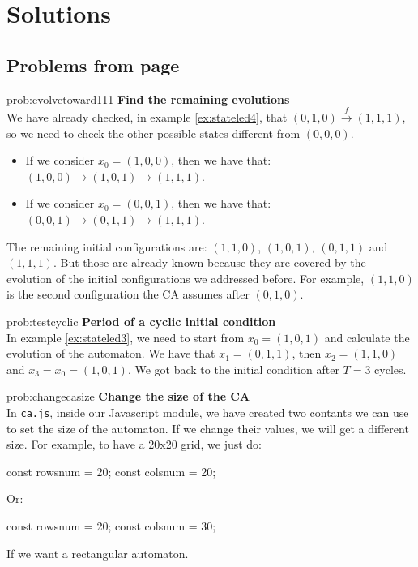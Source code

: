%

\chapter[Solutions]{Solutions}

\section*{Problems from page \pageref{sec:intro}}

\begin{sol}{prob:evolvetoward111}
\textbf{Find the remaining evolutions}\\
We have already checked, in example \ref{ex:stateled4}, that
$(0,1,0) \overset{f}{\rightarrow} (1,1,1)$, so we need to check the other possible
states different from $(0,0,0)$.
\begin{itemize}
\item If we consider $x_0 = (1,0,0)$, then we have that: $(1,0,0) \rightarrow (1,0,1) \rightarrow (1,1,1)$.
\item If we consider $x_0 = (0,0,1)$, then we have that: $(0,0,1) \rightarrow (0,1,1) \rightarrow (1,1,1)$.
\end{itemize}
The remaining initial configurations are: $(1,1,0)$, $(1,0,1)$, $(0,1,1)$ and $(1,1,1)$. But those are already
known because they are covered by the evolution of the initial configurations we addressed before. For example,
$(1,1,0)$ is the second configuration the CA assumes after $(0,1,0)$.
\end{sol}


\begin{sol}{prob:testcyclic}
\textbf{Period of a cyclic initial condition}\\
In example \ref{ex:stateled3}, we need to start from $x_0 = (1,0,1)$ and calculate the evolution of the automaton.
We have that $x_1 = (0,1,1)$, then $x_2 = (1,1,0)$ and $x_3 = x_ 0 = (1,0,1)$. We got back to the initial
condition after $T=3$ cycles.
\end{sol}

\begin{sol}{prob:changecasize}
\textbf{Change the size of the CA}\\
In \texttt{ca.js}, inside our Javascript module, we have created two contants we can use to set the size of the
automaton. If we change their values, we will get a different size. For example, to have a 20x20 grid,
we just do:
\begin{code}
const rowsnum = 20;
const colsnum = 20;
\end{code}
Or:
\begin{code}
const rowsnum = 20;
const colsnum = 30;
\end{code}
If we want a rectangular automaton.
\end{sol}


